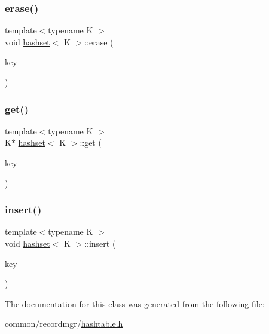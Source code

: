 \mbox{\label{classhashset_a4fe539e3a2242f64bf64df7b4a8aa105}} 
\subsubsection{\texorpdfstring{erase()}{erase()}}
{\footnotesize\ttfamily template$<$typename K $>$ \\
void \hyperlink{classhashset}{hashset}$<$ K $>$\+::erase (\begin{DoxyParamCaption}\item[{K $\ast$const}]{key }\end{DoxyParamCaption})\hspace{0.3cm}{\ttfamily [inline]}}

\mbox{\label{classhashset_aa19cc2749ccc333c0e5a7a0907ddaf68}} 
\subsubsection{\texorpdfstring{get()}{get()}}
{\footnotesize\ttfamily template$<$typename K $>$ \\
K$\ast$ \hyperlink{classhashset}{hashset}$<$ K $>$\+::get (\begin{DoxyParamCaption}\item[{K $\ast$const}]{key }\end{DoxyParamCaption})\hspace{0.3cm}{\ttfamily [inline]}}

\mbox{\label{classhashset_af64166df73b9d40ffca8c7ed131e849b}} 
\subsubsection{\texorpdfstring{insert()}{insert()}}
{\footnotesize\ttfamily template$<$typename K $>$ \\
void \hyperlink{classhashset}{hashset}$<$ K $>$\+::insert (\begin{DoxyParamCaption}\item[{K $\ast$const}]{key }\end{DoxyParamCaption})\hspace{0.3cm}{\ttfamily [inline]}}



The documentation for this class was generated from the following file\+:\begin{DoxyCompactItemize}
\item 
common/recordmgr/\hyperlink{hashtable_8h}{hashtable.\+h}\end{DoxyCompactItemize}
